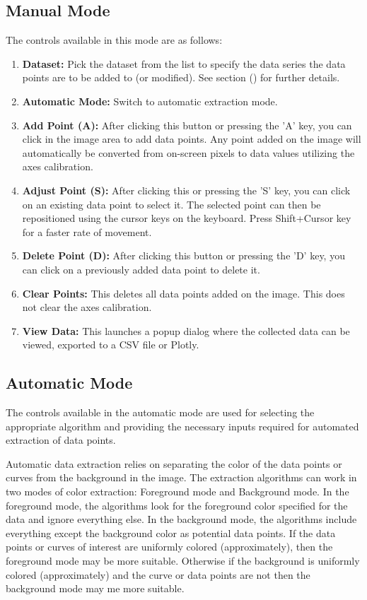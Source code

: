 \documentclass[letterpaper, 10pt]{article}
\begin{document}
\subsection{Manual Mode}
The controls available in this mode are as follows:
\begin{enumerate}
\item{{\bf Dataset: }Pick the dataset from the list to specify the data series the data points are to be added to (or modified). See section () for further details.}
\item{{\bf Automatic Mode: }Switch to automatic extraction mode.}
\item{{\bf Add Point (A): }After clicking this button or pressing the 'A' key, you can click in the image area to add data points. Any point added on the image will automatically be converted from on-screen pixels to data values utilizing the axes calibration.}
\item{{\bf Adjust Point (S): }After clicking this or pressing the 'S' key, you can click on an existing data point to select it. The selected point can then be repositioned using the cursor keys on the keyboard. Press Shift+Cursor key for a faster rate of movement.}
\item{{\bf Delete Point (D): }After clicking this button or pressing the 'D' key, you can click on a previously added data point to delete it.}
\item{{\bf Clear Points: }This deletes all data points added on the image. This does not clear the axes calibration.}
\item{{\bf View Data: }This launches a popup dialog where the collected data can be viewed, exported to a CSV file or Plotly.}
\end{enumerate}

\subsection{Automatic Mode}
The controls available in the automatic mode are used for selecting the appropriate algorithm and providing the necessary inputs required for automated extraction of data points. 

Automatic data extraction relies on separating the color of the data points or curves from the background in the image. The extraction algorithms can work in two modes of color extraction: Foreground mode and Background mode. In the foreground mode, the algorithms look for the foreground color specified for the data and ignore everything else. In the background mode, the algorithms include everything except the background color as potential data points. If the data points or curves of interest are uniformly colored (approximately), then the foreground mode may be more suitable. Otherwise if the background is uniformly colored (approximately) and the curve or data points are not then the background mode may me more suitable.
\end{document}

